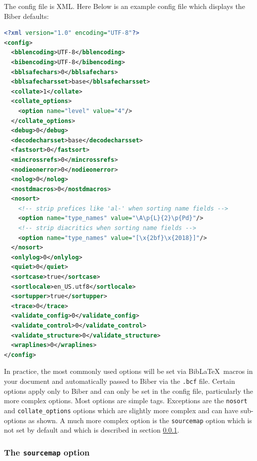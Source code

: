 \documentclass{ltxdockit}
\begin{document}
\noindent The config file is XML. Here Below is
an example config file which displays the Biber defaults:

\begin{lstlisting}[language=xml]
<?xml version="1.0" encoding="UTF-8"?>
<config>
  <bblencoding>UTF-8</bblencoding>
  <bibencoding>UTF-8</bibencoding>
  <bblsafechars>0</bblsafechars>
  <bblsafecharsset>base</bblsafecharsset>
  <collate>1</collate>
  <collate_options>
    <option name="level" value="4"/>
  </collate_options>
  <debug>0</debug>
  <decodecharsset>base</decodecharsset>
  <fastsort>0</fastsort>
  <mincrossrefs>0</mincrossrefs>
  <nodieonerror>0</nodieonerror>
  <nolog>0</nolog>
  <nostdmacros>0</nostdmacros>
  <nosort>
    <!-- strip prefices like 'al-' when sorting name fields -->
    <option name="type_names" value="\A\p{L}{2}\p{Pd}"/>
    <!-- strip diacritics when sorting name fields -->
    <option name="type_names" value="[\x{2bf}\x{2018}]"/>
  </nosort>
  <onlylog>0</onlylog>
  <quiet>0</quiet>
  <sortcase>true</sortcase>
  <sortlocale>en_US.utf8</sortlocale>
  <sortupper>true</sortupper>
  <trace>0</trace>
  <validate_config>0</validate_config>
  <validate_control>0</validate_control>
  <validate_structure>0</validate_structure>
  <wraplines>0</wraplines>
</config>
\end{lstlisting}

\noindent In practice, the most commonly used options will be set via
Bib\LaTeX\ macros in your document and automatically passed to Biber
via the \verb+.bcf+ file. Certain options apply only to Biber and can
only be set in the config file, particularly the more complex
options. Most options are simple tags. Exceptions are the
\verb+nosort+ and \verb+collate_options+ options which are slightly
more complex and can have sub-options as shown. A much more complex
option is the \verb+sourcemap+ option which is not set by default and
which is described in section \ref{map}.

\subsubsection{The \texttt{sourcemap} option}\label{map}
\end{document}
